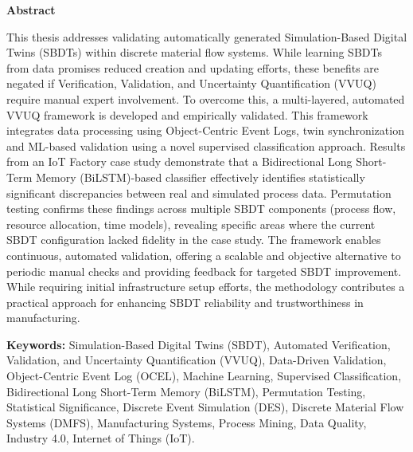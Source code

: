 \thispagestyle{plain} %

\vspace*{1.5in} %

\begin{center}
  {\Large \textbf{Abstract}}
\end{center}

This thesis addresses validating automatically generated Simulation-Based Digital Twins (SBDTs) within discrete material flow systems. While learning SBDTs from data promises reduced creation and updating efforts, these benefits are negated if Verification, Validation, and Uncertainty Quantification (VVUQ) require manual expert involvement. To overcome this, a multi-layered, automated VVUQ framework is developed and empirically validated. This framework integrates data processing using Object-Centric Event Logs, twin synchronization and ML-based validation using a novel supervised classification approach. Results from an IoT Factory case study demonstrate that a Bidirectional Long Short-Term Memory (BiLSTM)-based classifier effectively identifies statistically significant discrepancies between real and simulated process data. Permutation testing confirms these findings across multiple SBDT components (process flow, resource allocation, time models), revealing specific areas where the current SBDT configuration lacked fidelity in the case study. The framework enables continuous, automated validation, offering a scalable and objective alternative to periodic manual checks and providing feedback for targeted SBDT improvement. While requiring initial infrastructure setup efforts, the methodology contributes a practical approach for enhancing SBDT reliability and trustworthiness in manufacturing.

\vspace{0.3in}

\textbf{Keywords:} Simulation-Based Digital Twins (SBDT), Automated Verification, Validation, and Uncertainty Quantification (VVUQ), Data-Driven Validation, Object-Centric Event Log (OCEL), Machine Learning, Supervised Classification, Bidirectional Long Short-Term Memory (BiLSTM), Permutation Testing, Statistical Significance, Discrete Event Simulation (DES), Discrete Material Flow Systems (DMFS), Manufacturing Systems, Process Mining, Data Quality, Industry 4.0, Internet of Things (IoT).

\clearpage